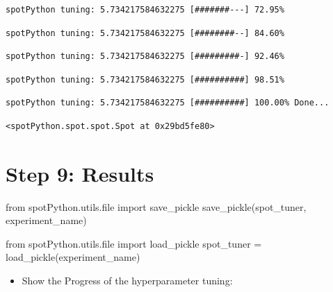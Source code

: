 \documentclass[
  letterpaper,
  DIV=11,
  numbers=noendperiod]{scrreprt}
\newenvironment{Shaded}{\begin{snugshade}}{\end{snugshade}}
\newcommand{\BuiltInTok}[1]{\textcolor[rgb]{0.00,0.23,0.31}{#1}}
\newcommand{\ImportTok}[1]{\textcolor[rgb]{0.00,0.46,0.62}{#1}}
\newcommand{\NormalTok}[1]{\textcolor[rgb]{0.00,0.23,0.31}{#1}}
\newcommand{\OperatorTok}[1]{\textcolor[rgb]{0.37,0.37,0.37}{#1}}
\providecommand{\tightlist}{%
  \setlength{\itemsep}{0pt}\setlength{\parskip}{0pt}}\usepackage{longtable,booktabs,array}
\begin{document}
\begin{verbatim}
spotPython tuning: 5.734217584632275 [#######---] 72.95% 
\end{verbatim}

\begin{verbatim}
spotPython tuning: 5.734217584632275 [########--] 84.60% 
\end{verbatim}

\begin{verbatim}
spotPython tuning: 5.734217584632275 [#########-] 92.46% 
\end{verbatim}

\begin{verbatim}
spotPython tuning: 5.734217584632275 [##########] 98.51% 
\end{verbatim}

\begin{verbatim}
spotPython tuning: 5.734217584632275 [##########] 100.00% Done...
\end{verbatim}

\begin{verbatim}
<spotPython.spot.spot.Spot at 0x29bd5fe80>
\end{verbatim}

\hypertarget{sec-results-tuning-10}{%
\section{Step 9: Results}\label{sec-results-tuning-10}}

\begin{Shaded}
\begin{Highlighting}[]
\ImportTok{from}\NormalTok{ spotPython.utils.}\BuiltInTok{file} \ImportTok{import}\NormalTok{ save\_pickle}
\NormalTok{save\_pickle(spot\_tuner, experiment\_name)}
\end{Highlighting}
\end{Shaded}

\begin{Shaded}
\begin{Highlighting}[]
\ImportTok{from}\NormalTok{ spotPython.utils.}\BuiltInTok{file} \ImportTok{import}\NormalTok{ load\_pickle}
\NormalTok{spot\_tuner }\OperatorTok{=}\NormalTok{ load\_pickle(experiment\_name)}
\end{Highlighting}
\end{Shaded}

\begin{itemize}
\tightlist
\item
  Show the Progress of the hyperparameter tuning:
\end{itemize}
\end{document}
